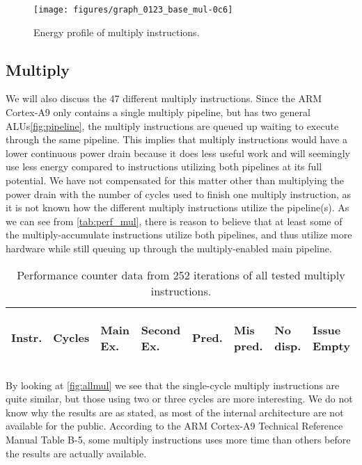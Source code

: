 \begin{figure*}
    \centering
    \texttt{[image: figures/graph\_0123\_base\_mul-0c6]}
    \caption{Energy profile of multiply instructions.}
    \label{fig:allmul}
\end{figure*}

\subsection{Multiply}
We will also discuss the 47 different multiply instructions. Since the ARM
Cortex-A9 only contains a single multiply pipeline, but has two general
ALUs\autoref{fig:pipeline}, the multiply instructions are queued up waiting to
execute through the same pipeline. This implies that multiply instructions would
have a lower continuous power drain because it does less useful work and will
seemingly use less energy compared to instructions utilizing both pipelines at
its full potential. We have not compensated for this matter other than
multiplying the power drain with the number of cycles used to finish one
multiply instruction, as it is not known how the different multiply instructions
utilize the pipeline(s). As we can see from \autoref{tab:perf_mul}, there is
reason to believe that at least some of the multiply-accumulate instructions
utilize both pipelines\cite{ramangcc}, and thus utilize more hardware while
still queuing up through the multiply-enabled main
pipeline.

\begin{table}
    \centering
    \begin{tabular}{|p{0.7cm}|R{0.8cm}R{0.6cm}R{0.85cm}R{0.6cm}R{0.45cm}R{0.75cm}R{0.72cm}|}
        \hline
        \centering
        Instr. &
        \centering
        Cycles &
        \centering
        Main Ex. &
        \centering
        Second Ex. &
        \centering
        Pred.&
        \centering
        Mis pred.&
        \centering
        No disp. &
        \begin{centering}
        Issue Empty
        \end{centering}
        \\
        \hline
        
        \hline
    \end{tabular}
    \caption{Performance counter data from 252 iterations of all tested multiply
    instructions.}
    \label{tab:perf_mul}
\end{table}

By looking at \autoref{fig:allmul} we see that the single-cycle multiply
instructions are quite similar, but those using two or three cycles are more
interesting. We do not know why the results are as stated, as most of the
internal architecture are not available for the public. According to the ARM
Cortex-A9 Technical Reference Manual Table B-5, some multiply instructions uses
more time than others before the results are actually available\cite{armtech}.

